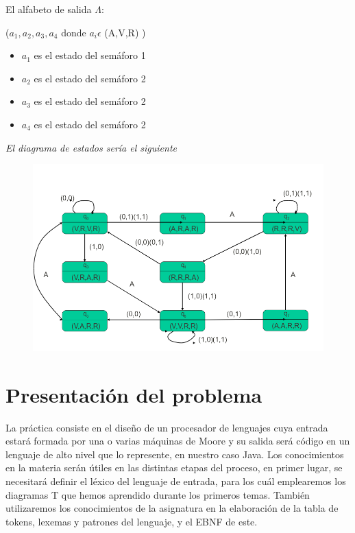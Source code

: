 \documentclass[12pt,a4paper]{article}
\begin{document}
El alfabeto de salida $\Lambda$: { ($a_{1},a_{2},a_{3},a_{4}$ donde $a_{i}\epsilon$ (A,V,R) )
	\begin{itemize}
		\item $a_{1}$ es el estado del semáforo 1
		\item $a_{2}$ es el estado del semáforo 2
		\item $a_{3}$ es el estado del semáforo 2
		\item $a_{4}$ es el estado del semáforo 2
	\end{itemize}

	\begin{center}
		\textit{El diagrama de estados sería el siguiente}
	\end{center}

	\begin{figure}[h]
		\centering
		\includegraphics[width=0.7
		\linewidth]{img/3}
		\caption{}
		\label{fig:3}
	\end{figure}

	\newpage
	\section{Presentación del problema}
	La práctica consiste en el diseño de un procesador de lenguajes cuya entrada estará formada por una o varias máquinas de Moore y su salida será código en un lenguaje de alto nivel que lo represente, en nuestro caso Java.
	\newline
	\newline
	Los conocimientos en la materia serán útiles en las distintas etapas del proceso, en primer lugar, se necesitará definir el léxico del lenguaje de entrada, para los cuál emplearemos los diagramas T que hemos aprendido durante los primeros temas.
	\newline
	\newline
	También utilizaremos los conocimientos de la asignatura en la elaboración de la tabla de tokens, lexemas y patrones del lenguaje, y el EBNF de este.
	
}
\end{document}

